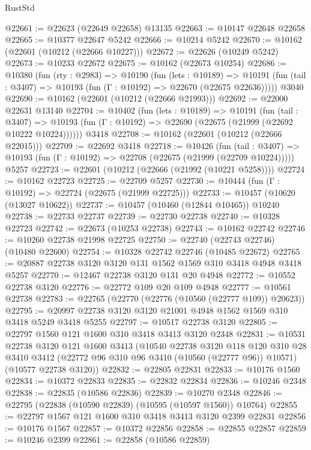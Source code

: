 \begin{lexlean}{RustStd}
\begin{coremodule}
@22661 := @22623 (@22649 @22658) @13135
@22663 := @10147 @22648 @22658
@22665 := @10377 @22647 @5242
@22666 := @10214 @5242
@22670 := @10162 (@22601 (@10212 (@22666 @10227)))
@22672 := @22626 (@10249 @5242)
@22673 := @10233 @22672
@22675 := @10162 (@22673 @10254)
@22686 := @10380
    (fun (rty : @2983) =>
    @10190
      (fun (lets : @10189) =>
      @10191 (fun (tail : @3407) => @10193 (fun (Γ : @10192) => @22670 (@22675 @22636)))))
    @3040
@22690 := @10162 (@22601 (@10212 (@22666 @21993)))
@22692 := @22000 @22631 @13140
@22704 := @10402
    (fun (lets : @10189) =>
    @10191
      (fun (tail : @3407) =>
      @10193 (fun (Γ : @10192) => @22690 (@22675 (@21999 (@22692 @10222 @10224))))))
    @3418
@22708 := @10162 (@22601 (@10212 (@22666 @22015)))
@22709 := @22692 @3418
@22718 := @10426
    (fun (tail : @3407) => @10193 (fun (Γ : @10192) => @22708 (@22675 (@21999 (@22709 @10224)))))
    @5257
@22723 := @22601 (@10212 (@22666 (@21992 (@10221 @5258))))
@22724 := @10162 @22723
@22725 := @22709 @5257
@22730 := @10444 (fun (Γ : @10192) => @22724 (@22675 (@21999 @22725)))
@22733 := @10457 (@10620 (@13027 @10622))
@22737 := @10457 (@10460 (@12844 @10465)) @10240
@22738 := @22733 @22737
@22739 := @22730 @22738
@22740 := @10328 @22723
@22742 := @22673 (@10253 @22738)
@22743 := @10162 @22742
@22746 := @10260 @22738 @21998 @22725
@22750 := @22740 (@22743 @22746) (@10480 @22600)
@22754 := @10328 @22742 @22746 (@10485 @22672)
@22765 := @20887 @22738 @3120 @3120 @131 @1562 @1569 @310 @3418 @4948 @3418 @5257
@22770 := @12467 @22738 @3120 @131 @20 @4948
@22772 := @10552 @22738 @3120
@22776 := @22772 @109 @20 @109 @4948
@22777 := @10561 @22738
@22783 := @22765 (@22770 (@22776 (@10560 (@22777 @109)) @20623))
@22795 := @20997 @22738 @3120 @3120 @21001 @4948 @1562 @1569 @310 @3418 @5249 @3418 @5255
@22797 := @10517 @22738 @3120
@22805 := @22797 @1560 @121 @1600 @310 @3418 @3413 @3120 @2348
@22831 := @10531
    @22738
    @3120
    @121
    @1600
    @3413
    (@10540
      @22738
      @3120
      @118
      @120
      @310
      @28
      @3410
      @3412
      (@22772 @96 @310 @96 @3410 (@10560 (@22777 @96)) @10571)
      (@10577 @22738 @3120))
@22832 := @22805 @22831
@22833 := @10176 @1560
@22834 := @10372 @22833
@22835 := @22832 @22834
@22836 := @10246 @2348
@22838 := @22835 (@10586 @22836)
@22839 := @10270 @2348
@22846 := @22795 (@22838 (@10590 @22839) (@10595 (@10597 @1560)) @10764)
@22855 := @22797 @1567 @121 @1600 @310 @3418 @3413 @3120 @2399 @22831
@22856 := @10176 @1567
@22857 := @10372 @22856
@22858 := @22855 @22857
@22859 := @10246 @2399
@22861 := @22858 (@10586 @22859)

\end{coremodule}
\end{lexlean}

